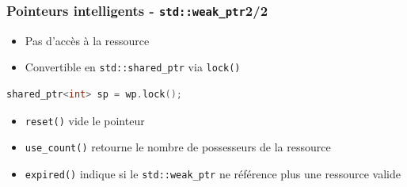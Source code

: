 \documentclass[C++.tex]{subfiles}
\begin{document}
\begin{frame}[fragile]
	\frametitle{Pointeurs intelligents - \lstinline|std::weak_ptr|\titlehfill{}2/2}
	\begin{itemize}
		\item Pas d'accès à la ressource
		\item Convertible en \lstinline|std::shared_ptr| via \lstinline|lock()|

	\end{itemize}

	\begin{lstlisting}[language=C++]
shared_ptr<int> sp = wp.lock();\end{lstlisting}

	\begin{itemize}
		\item \lstinline|reset()| vide le pointeur
		\item \lstinline|use_count()| retourne le nombre de possesseurs de la ressource


		\item \lstinline|expired()| indique si le \lstinline|std::weak_ptr| ne référence plus une ressource valide

	\end{itemize}
\end{frame}
\end{document}
